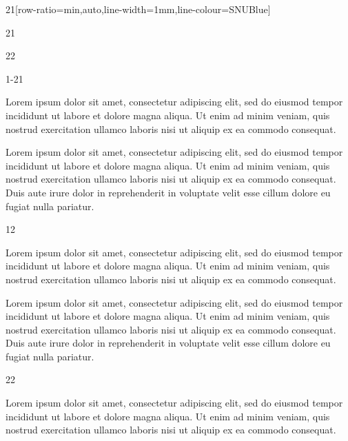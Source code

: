 \documentclass{ropas-poster}
\begin{document}
\begin{postergrid}{2}{1}[row-ratio={min,auto},line-width=1mm,line-colour=SNUBlue]
\begin{posterblock*}{2}{1}
\begin{postergrid}{2}{2}
\begin{posterblock}{1-2}{1}

          Lorem ipsum dolor sit amet, consectetur adipiscing elit, sed do eiusmod tempor incididunt ut labore et dolore magna aliqua.
          Ut enim ad minim veniam, quis nostrud exercitation ullamco laboris nisi ut aliquip ex ea commodo consequat.


          Lorem ipsum dolor sit amet, consectetur adipiscing elit, sed do eiusmod tempor incididunt ut labore et dolore magna aliqua.
          Ut enim ad minim veniam, quis nostrud exercitation ullamco laboris nisi ut aliquip ex ea commodo consequat.
          Duis aute irure dolor in reprehenderit in voluptate velit esse cillum dolore eu fugiat nulla pariatur.
        \end{posterblock}

        \begin{posterblock}{1}{2}


          Lorem ipsum dolor sit amet, consectetur adipiscing elit, sed do eiusmod tempor incididunt ut labore et dolore magna aliqua.
          Ut enim ad minim veniam, quis nostrud exercitation ullamco laboris nisi ut aliquip ex ea commodo consequat.


          Lorem ipsum dolor sit amet, consectetur adipiscing elit, sed do eiusmod tempor incididunt ut labore et dolore magna aliqua.
          Ut enim ad minim veniam, quis nostrud exercitation ullamco laboris nisi ut aliquip ex ea commodo consequat.
          Duis aute irure dolor in reprehenderit in voluptate velit esse cillum dolore eu fugiat nulla pariatur.
        \end{posterblock}

        \begin{posterblock}{2}{2}

          Lorem ipsum dolor sit amet, consectetur adipiscing elit, sed do eiusmod tempor incididunt ut labore et dolore magna aliqua.
          Ut enim ad minim veniam, quis nostrud exercitation ullamco laboris nisi ut aliquip ex ea commodo consequat.
        \end{posterblock}
      \end{postergrid}
    \end{posterblock*}
  \end{postergrid}
\end{document}
